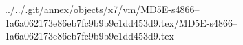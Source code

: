 ../../.git/annex/objects/x7/vm/MD5E-s4866--1a6a062173e86eb7fc9b9b9c1dd453d9.tex/MD5E-s4866--1a6a062173e86eb7fc9b9b9c1dd453d9.tex